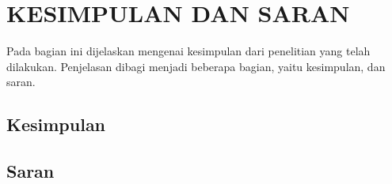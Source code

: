 \documentclass[ugmtesis]{ugmtesis}
\begin{document}
\chapter{KESIMPULAN DAN SARAN}
\label{kesimpulan dan saran}
Pada bagian ini dijelaskan mengenai kesimpulan dari penelitian yang telah dilakukan. Penjelasan dibagi menjadi beberapa bagian, yaitu kesimpulan, dan saran.

	\section{Kesimpulan}
	\label{penutup kesimpulan}
	

	\section{Saran}
	\label{penutup saran}
	






%

\end{document}
